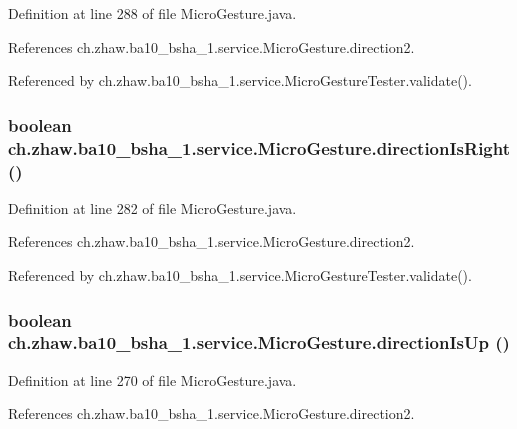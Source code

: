 Definition at line 288 of file MicroGesture.java.

References ch.zhaw.ba10\_\-bsha\_\-1.service.MicroGesture.direction2.

Referenced by ch.zhaw.ba10\_\-bsha\_\-1.service.MicroGestureTester.validate().\hypertarget{classch_1_1zhaw_1_1ba10__bsha__1_1_1service_1_1MicroGesture_a265dca7b768b336a90d0177b1a299949}{
\subsubsection[{directionIsRight}]{\setlength{\rightskip}{0pt plus 5cm}boolean ch.zhaw.ba10\_\-bsha\_\-1.service.MicroGesture.directionIsRight ()}}
\label{classch_1_1zhaw_1_1ba10__bsha__1_1_1service_1_1MicroGesture_a265dca7b768b336a90d0177b1a299949}


Definition at line 282 of file MicroGesture.java.

References ch.zhaw.ba10\_\-bsha\_\-1.service.MicroGesture.direction2.

Referenced by ch.zhaw.ba10\_\-bsha\_\-1.service.MicroGestureTester.validate().\hypertarget{classch_1_1zhaw_1_1ba10__bsha__1_1_1service_1_1MicroGesture_ac7b68d3f3a9efd30535baf0c60b9024f}{
\subsubsection[{directionIsUp}]{\setlength{\rightskip}{0pt plus 5cm}boolean ch.zhaw.ba10\_\-bsha\_\-1.service.MicroGesture.directionIsUp ()}}
\label{classch_1_1zhaw_1_1ba10__bsha__1_1_1service_1_1MicroGesture_ac7b68d3f3a9efd30535baf0c60b9024f}


Definition at line 270 of file MicroGesture.java.

References ch.zhaw.ba10\_\-bsha\_\-1.service.MicroGesture.direction2.

